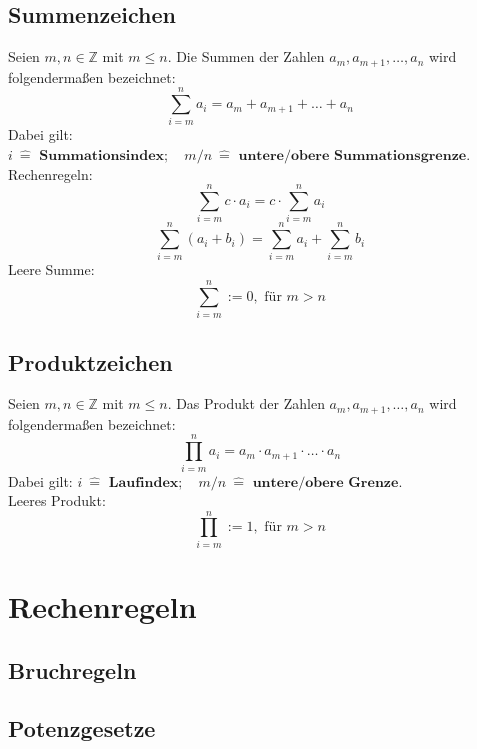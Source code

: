 \documentclass[12pt]{article}
\begin{document}
\subsection{Summenzeichen}
Seien $m, n \in \mathbb{Z}$ mit $m \leq n$. Die Summen der Zahlen $a_m, a_{m+1}, \dots, a_n$ wird folgendermaßen bezeichnet:
\[\sum_{i=m}^{n}a_i = a_m + a_{m+1} + \ldots + a_n\]
Dabei gilt: $i \: \widehat{=} \textbf{ Summationsindex}; \quad m/n \: \widehat{=} \textbf{ untere/obere Summationsgrenze}$.
Rechenregeln:
\[\sum_{i=m}^{n}c \cdot a_i = c \cdot \sum_{i=m}^{n}a_i\]
\[\sum_{i=m}^{n}(a_i + b_i) = \sum_{i=m}^{n}a_i + \sum_{i=m}^{n}b_i\]
Leere Summe:
\[\sum_{i=m}^{n} := 0, \text{ für } m > n\]
\subsection{Produktzeichen}
Seien $m, n \in \mathbb{Z}$ mit $m \leq n$. Das Produkt der Zahlen $a_m, a_{m+1},\ldots, a_n$ wird folgendermaßen bezeichnet:
\[\prod_{i=m}^{n}a_i = a_m \cdot a_{m+1} \cdot \ldots \cdot a_n\]
Dabei gilt: $i \: \widehat{=} \textbf{ Laufindex}; \quad m/n \: \widehat{=} \textbf{ untere/obere Grenze}$. \\
Leeres Produkt:
\[\prod_{i=m}^{n} := 1, \text{ für } m > n\]

\newpage
\section{Rechenregeln}
\subsection{Bruchregeln}
\begin{center}
\end{center}

\subsection{Potenzgesetze}
\begin{center}
\end{center}
\end{document}
